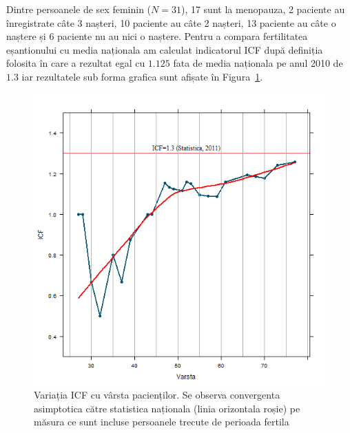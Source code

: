 \documentclass[12pt,draft]{article}
\begin{document}
  Dintre persoanele de sex feminin ($N=31$), 17 sunt la menopauza, 2 paciente au înregistrate câte 3 nașteri, 10 paciente au câte 2 nașteri, 13 paciente au câte o naștere și 6 paciente nu au nici o naștere. Pentru a compara fertilitatea eșantionului cu media naționala am calculat indicatorul \ac{ICF} după definiția folosita în \citep{insee2011} care a rezultat egal cu $1.125$ fata de media naționala pe anul 2010 de $1.3$ iar rezultatele sub forma grafica sunt afișate în Figura~\ref{fig:incoNasteriICF}.
  \begin{figure}[H]
    \centering
    \includegraphics[width=0.8\linewidth]{incoNasteriICF}
    \caption{Variația ICF cu vârsta pacienților. Se observa convergenta asimptotica către statistica naționala (linia orizontala roșie) pe măsura ce sunt incluse persoanele trecute de perioada fertila }
    \label{fig:incoNasteriICF}
  \end{figure}
  
\end{document}
